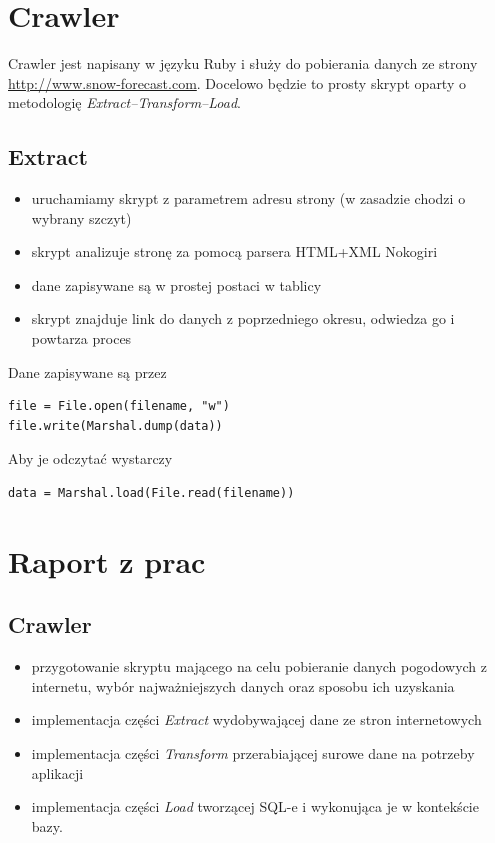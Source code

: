 \documentclass[12pt]{article}
\begin{document}
\newpage

\section{Crawler}
Crawler jest napisany w języku Ruby i służy do pobierania danych ze strony
\\\url{http://www.snow-forecast.com}.
Docelowo będzie to prosty skrypt oparty o metodologię \emph{Extract--Transform--Load}.
\subsection{Extract}
\begin{itemize}
\item uruchamiamy skrypt z parametrem adresu strony (w zasadzie chodzi o wybrany szczyt)
\item skrypt analizuje stronę za pomocą parsera HTML+XML Nokogiri
\item dane zapisywane są w prostej postaci w tablicy
\item skrypt znajduje link do danych z poprzedniego okresu, odwiedza go i powtarza proces
\end{itemize}
Dane zapisywane są przez
\begin{verbatim}
file = File.open(filename, "w")
file.write(Marshal.dump(data))
\end{verbatim}
Aby je odczytać wystarczy
\begin{verbatim}
data = Marshal.load(File.read(filename))
\end{verbatim}

\section{Raport z prac}
\subsection{Crawler}
\begin{itemize}
  \item przygotowanie skryptu mającego na celu pobieranie danych pogodowych z internetu, wybór
  najważniejszych danych oraz sposobu ich uzyskania
  \item implementacja części \emph{Extract} wydobywającej dane ze stron internetowych
  \item implementacja części \emph{Transform} przerabiającej surowe dane na potrzeby aplikacji
  \item implementacja części \emph{Load} tworzącej SQL-e i wykonująca je w kontekście bazy.
\end{itemize}
\end{document}

